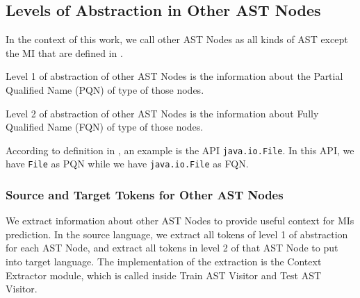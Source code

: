 \subsection{Levels of Abstraction in Other AST Nodes}
In the context of this work, we call other AST Nodes as all kinds of AST except the MI that are defined in \cite{id:ASTDocumentation}.
\begin{definition}
Level 1 of abstraction of other AST Nodes is the information about the Partial Qualified Name (PQN) of type of those nodes.
\end{definition}
\begin{definition}
Level 2 of abstraction of other AST Nodes is the information about Fully Qualified Name (FQN) of type of those nodes.
\end{definition}
According to definition in \cite{8453132}, an example is the API \texttt{java.io.File}. In this API, we have \texttt{File} as PQN while we have \texttt{java.io.File} as FQN.

\subsubsection{Source and Target Tokens for Other AST Nodes}
We extract information about other AST Nodes to provide useful context for MIs prediction. In the source language, we extract all tokens of level 1 of abstraction for each AST Node, and extract all tokens in level 2 of that AST Node to put into target language. The implementation of the extraction is the Context Extractor module, which is called inside Train AST Visitor and Test AST Visitor. 

